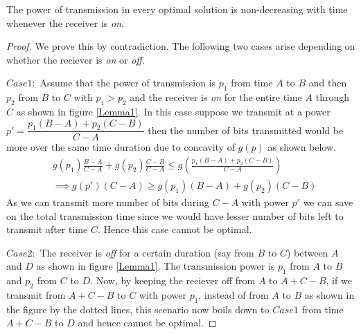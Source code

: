 \begin{lemma}
The power of transmission in every optimal solution is non-decreasing with time whenever the receiver is \textit{on}.
\label{increasing_power}
\end{lemma}
\begin{proof}
We prove this by contradiction. The following two cases arise depending on whether the reciever is \textit{on} or \textit{off}.

$Case 1:$ Assume that the power of transmission is $p_1$ from time $A$ to $B$ and then $p_2$ from $B$ to $C$ with $p_1>p_2$ and the receiver is \textit{on} for the entire time $A$ through $C$ as shown in figure \ref{Lemma1}. In this case suppose we transmit at a power $p'=\dfrac{p_1(B-A)+p_2(C-B)}{C-A}$ then the number of bits transmitted would be more over the same time duration due to concavity of $g(p)$ as shown below.
\begin{align}
&g(p_1)\frac{B-A}{C-A}+g(p_2)\frac{C-B}{C-A} \le g(\frac{p_1(B-A)+p_2(C-B)}{C-A})
\\
&\implies g(p')(C-A)\ge g(p_1)(B-A)+g(p_2)(C-B)  
\end{align}
As we can transmit more number of bits during $C-A$ with power $p'$ we can save on the total transmission time since we would have lesser number of bits left to transmit after time $C$. Hence this case cannot be optimal.

$Case 2:$ The receiver is \textit{off} for a certain duration (say from $B$ to $C$) between $A$ and $D$ as shown in figure \ref{Lemma1}. The transmission power is $p_1$ from $A$ to $B$ and $p_2$ from $C$ to $D$. Now, by keeping the reciever off from $A$ to $A+C-B$, if we transmit from $A+C-B$ to $C$ with power $p_1$, instead of from $A$ to $B$ as shown in the figure by the dotted lines, this scenario now boils down to $Case 1$ from time $A+C-B$ to $D$ and hence cannot be optimal.
\end{proof}

